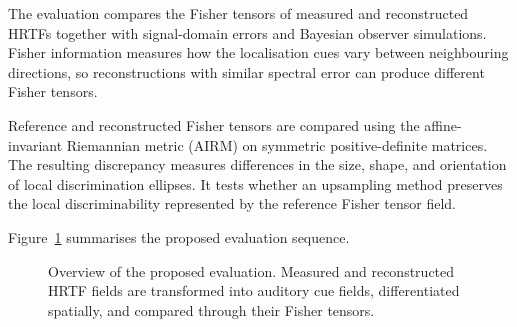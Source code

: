 \documentclass[journal]{IEEEtran}
\begin{document}
The evaluation compares the Fisher tensors of measured and reconstructed HRTFs together with signal-domain errors and Bayesian observer simulations. Fisher information measures how the localisation cues vary between neighbouring directions, so reconstructions with similar spectral error can produce different Fisher tensors.

Reference and reconstructed Fisher tensors are compared using the affine-invariant Riemannian metric (AIRM) on symmetric positive-definite matrices. The resulting discrepancy measures differences in the size, shape, and orientation of local discrimination ellipses. It tests whether an upsampling method preserves the local discriminability represented by the reference Fisher tensor field.

Figure~\ref{fig:evaluation_pipeline} summarises the proposed evaluation sequence.
\begin{figure}[t]
    \centering
    \caption{Overview of the proposed evaluation. Measured and reconstructed HRTF fields are transformed into auditory cue fields, differentiated spatially, and compared through their Fisher tensors.}
    \label{fig:evaluation_pipeline}
\end{figure}
\end{document}
